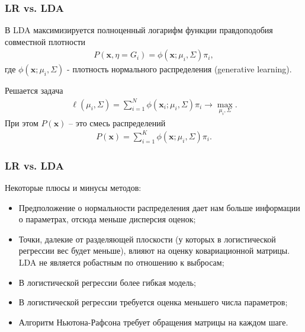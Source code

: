 \documentclass{beamer}
\begin{document}
\begin{frame}
  \frametitle{LR vs. LDA}
  В LDA максимизируется полноценный логарифм функции правдоподобия совместной плотности
  \begin{align*}
    P(\mathbf{x} , \eta = G_i) =  \phi(\mathbf{x}; \mu_i, \Sigma)\pi_i,
  \end{align*}
  где $\phi(\mathbf{x}; \mu_i, \Sigma)$ - плотность нормального распределения (generative learning).

  Решается задача
  \begin{align*}
    \ell(\mu_i, \Sigma) = \sum_{i = 1}^{N} \phi(\mathbf{x}_i; \mu_i, \Sigma)\pi_i \rightarrow \max_{\mu_i, \Sigma}.
  \end{align*}
  При этом $P(\mathbf{x})$ -- это смесь распределений
  \begin{align*}
    P(\mathbf{x}) =  \sum_{i = 1}^K \phi(\mathbf{x}; \mu_i, \Sigma)\pi_i.
  \end{align*}
\end{frame}
\begin{frame}
    \frametitle{LR vs. LDA}
    Некоторые плюсы и минусы методов:
    \begin{itemize}
      \item Предположение о нормальности распределения дает нам больше информации о параметрах, отсюда меньше дисперсия оценок;
      \item Точки, далекие от разделяющей плоскости (у которых в логистической регрессии вес будет меньше), влияют на оценку ковариационной матрицы. LDA не является робастным по отношению к выбросам;
      \item  В логистической регрессии более гибкая модель;
      \item  В логистической регрессии требуется оценка меньшего числа параметров;
      \item  Алгоритм Ньютона-Рафсона требует обращения матрицы на каждом шаге.
    \end{itemize}
\end{frame}
\end{document}
